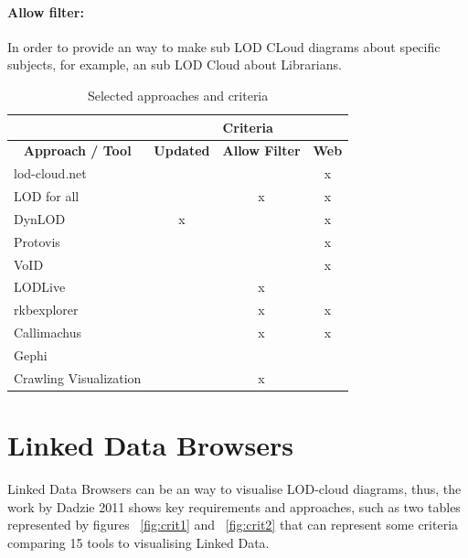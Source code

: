 

\paragraph{Allow filter:} In order to provide an way to make sub LOD CLoud diagrams about specific subjects, for example, an sub LOD Cloud about Librarians. 

\begin{table}[htbp]
\caption{Selected approaches and criteria }
\begin{tabular}{|l|c|c|c|}
\hline
 & \multicolumn{ 3}{c|}{\textbf{Criteria}} \\ \hline
\multicolumn{1}{|c|}{\textbf{Approach / Tool}} & \textbf{Updated} & \textbf{Allow Filter} & \textbf{Web} \\ \hline
lod-cloud.net  &  &  & x \\ \hline
LOD for all &  & x & x \\ \hline
DynLOD & x &  & x \\ \hline
Protovis &  &  & x \\ \hline
VoID &  &  & x \\ \hline
LODLive &  & x &  \\ \hline
rkbexplorer &  & x & x \\ \hline
Callimachus &  & x & x \\ \hline
Gephi\\Crawling Visualization &  & x &  \\ \hline
\end{tabular}
\label{Criteria}
\end{table}

\section{Linked Data Browsers}

Linked Data Browsers can be an way to visualise LOD-cloud diagrams, thus, the work by Dadzie 2011 \cite{Dadzie2011} shows key requirements and approaches, such as two tables represented by figures ~\ref{fig:crit1} and ~\ref{fig:crit2} that can represent some criteria comparing 15 tools to visualising Linked Data.

